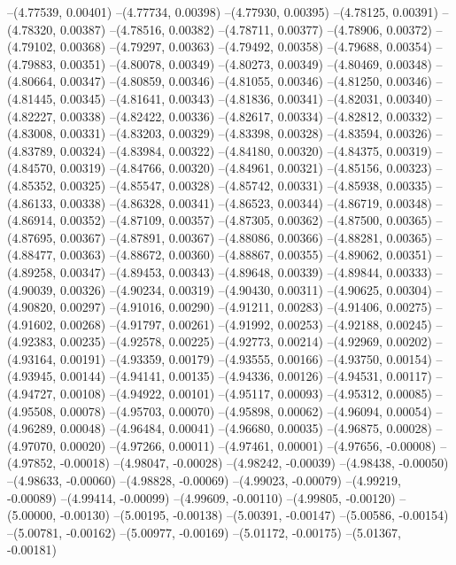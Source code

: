--(4.77539, 0.00401)
--(4.77734, 0.00398)
--(4.77930, 0.00395)
--(4.78125, 0.00391)
--(4.78320, 0.00387)
--(4.78516, 0.00382)
--(4.78711, 0.00377)
--(4.78906, 0.00372)
--(4.79102, 0.00368)
--(4.79297, 0.00363)
--(4.79492, 0.00358)
--(4.79688, 0.00354)
--(4.79883, 0.00351)
--(4.80078, 0.00349)
--(4.80273, 0.00349)
--(4.80469, 0.00348)
--(4.80664, 0.00347)
--(4.80859, 0.00346)
--(4.81055, 0.00346)
--(4.81250, 0.00346)
--(4.81445, 0.00345)
--(4.81641, 0.00343)
--(4.81836, 0.00341)
--(4.82031, 0.00340)
--(4.82227, 0.00338)
--(4.82422, 0.00336)
--(4.82617, 0.00334)
--(4.82812, 0.00332)
--(4.83008, 0.00331)
--(4.83203, 0.00329)
--(4.83398, 0.00328)
--(4.83594, 0.00326)
--(4.83789, 0.00324)
--(4.83984, 0.00322)
--(4.84180, 0.00320)
--(4.84375, 0.00319)
--(4.84570, 0.00319)
--(4.84766, 0.00320)
--(4.84961, 0.00321)
--(4.85156, 0.00323)
--(4.85352, 0.00325)
--(4.85547, 0.00328)
--(4.85742, 0.00331)
--(4.85938, 0.00335)
--(4.86133, 0.00338)
--(4.86328, 0.00341)
--(4.86523, 0.00344)
--(4.86719, 0.00348)
--(4.86914, 0.00352)
--(4.87109, 0.00357)
--(4.87305, 0.00362)
--(4.87500, 0.00365)
--(4.87695, 0.00367)
--(4.87891, 0.00367)
--(4.88086, 0.00366)
--(4.88281, 0.00365)
--(4.88477, 0.00363)
--(4.88672, 0.00360)
--(4.88867, 0.00355)
--(4.89062, 0.00351)
--(4.89258, 0.00347)
--(4.89453, 0.00343)
--(4.89648, 0.00339)
--(4.89844, 0.00333)
--(4.90039, 0.00326)
--(4.90234, 0.00319)
--(4.90430, 0.00311)
--(4.90625, 0.00304)
--(4.90820, 0.00297)
--(4.91016, 0.00290)
--(4.91211, 0.00283)
--(4.91406, 0.00275)
--(4.91602, 0.00268)
--(4.91797, 0.00261)
--(4.91992, 0.00253)
--(4.92188, 0.00245)
--(4.92383, 0.00235)
--(4.92578, 0.00225)
--(4.92773, 0.00214)
--(4.92969, 0.00202)
--(4.93164, 0.00191)
--(4.93359, 0.00179)
--(4.93555, 0.00166)
--(4.93750, 0.00154)
--(4.93945, 0.00144)
--(4.94141, 0.00135)
--(4.94336, 0.00126)
--(4.94531, 0.00117)
--(4.94727, 0.00108)
--(4.94922, 0.00101)
--(4.95117, 0.00093)
--(4.95312, 0.00085)
--(4.95508, 0.00078)
--(4.95703, 0.00070)
--(4.95898, 0.00062)
--(4.96094, 0.00054)
--(4.96289, 0.00048)
--(4.96484, 0.00041)
--(4.96680, 0.00035)
--(4.96875, 0.00028)
--(4.97070, 0.00020)
--(4.97266, 0.00011)
--(4.97461, 0.00001)
--(4.97656, -0.00008)
--(4.97852, -0.00018)
--(4.98047, -0.00028)
--(4.98242, -0.00039)
--(4.98438, -0.00050)
--(4.98633, -0.00060)
--(4.98828, -0.00069)
--(4.99023, -0.00079)
--(4.99219, -0.00089)
--(4.99414, -0.00099)
--(4.99609, -0.00110)
--(4.99805, -0.00120)
--(5.00000, -0.00130)
--(5.00195, -0.00138)
--(5.00391, -0.00147)
--(5.00586, -0.00154)
--(5.00781, -0.00162)
--(5.00977, -0.00169)
--(5.01172, -0.00175)
--(5.01367, -0.00181)
